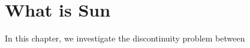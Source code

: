 \chapter{What is Sun}  \label{chp2}
In this chapter, we investigate the discontinuity problem between 